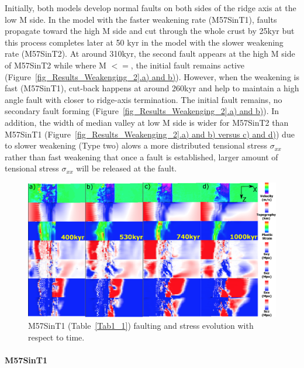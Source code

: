 Initially, both models develop normal faults on both sides of the ridge axis at the low M side. In the model with the faster weakening rate (M57SinT1), faults propagate toward the high M side and cut through the whole crust by 25kyr but this process completes later at 50 kyr in the model with the slower weakening rate (M57SinT2). At around 310kyr, the second fault appears at the high M side of M57SinT2 while where M $<=$, the initial fault remains active (Figure~\hyperref[fig_Results_Weakenging_2]{\ref{fig_Results_Weakenging_2}.a) and b)}). However, when the weakening is fast (M57SinT1), cut-back happens at around 260kyr and help to maintain a high angle fault with closer to ridge-axis termination. The initial fault remains, no secondary fault forming (Figure~\hyperref[fig_Results_Weakenging_2]{\ref{fig_Results_Weakenging_2}.a) and b)}). In addition, the width of median valley at low M side is wider for M57SinT2 than M57SinT1 (Figure~\hyperref[fig_Results_Weakenging_2]{\ref{fig_Results_Weakenging_2}.a) and b) versus c) and d)}) due to slower weakening (Type two) alows a more distributed tensional stress $\sigma_{xx}$ rather than fast weakening that once a fault is established, larger amount of tensional stress $\sigma_{xx}$ will be released at the fault.  

\begin{figure}[h]
 \centering
  \includegraphics[width=1.0\textwidth]{./Figures/fig_Results_Weakening_3_M57SinT1_time_evolution.eps}
 \caption{M57SinT1 (Table~\hyperref[Tab1_1]{\ref{Tab1_1}}) faulting and stress evolution with respect to time.}
\label{fig_Results_Weakenging_3}
\end{figure}

\paragraph{M57SinT1}\label{para_M57SinT1}

